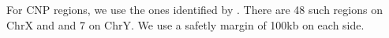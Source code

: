 \documentclass[11pt,a4paper]{article}
\newcommand{\GWSSix}{GWS6\xspace}
\newcommand{\citet}[1]{\cite{#1}}
\begin{document}
For CNP regions, we use the ones identified by \citet{RedonR_etal_2006}.  There are 48 such regions on ChrX and and 7 on ChrY.  We use a safetly margin of 100kb on each side.




\end{document}
